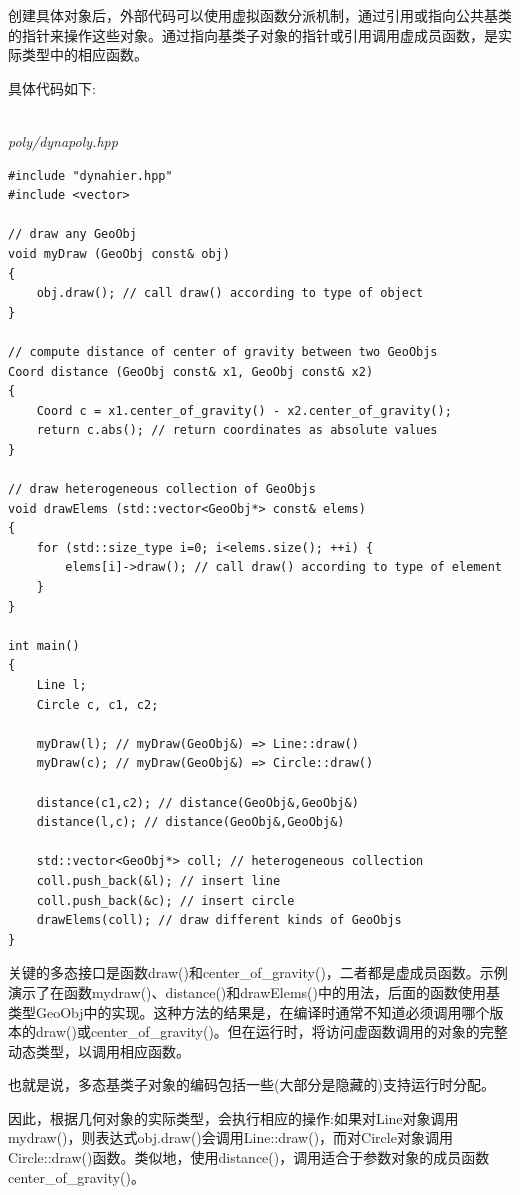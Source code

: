创建具体对象后，外部代码可以使用虚拟函数分派机制，通过引用或指向公共基类的指针来操作这些对象。通过指向基类子对象的指针或引用调用虚成员函数，是实际类型中的相应函数。

具体代码如下:

\hspace*{\fill} \\ %
\noindent
\textit{poly/dynapoly.hpp}
\begin{lstlisting}[style=styleCXX]
#include "dynahier.hpp"
#include <vector>

// draw any GeoObj
void myDraw (GeoObj const& obj)
{
	obj.draw(); // call draw() according to type of object
}

// compute distance of center of gravity between two GeoObjs
Coord distance (GeoObj const& x1, GeoObj const& x2)
{
	Coord c = x1.center_of_gravity() - x2.center_of_gravity();
	return c.abs(); // return coordinates as absolute values
}

// draw heterogeneous collection of GeoObjs
void drawElems (std::vector<GeoObj*> const& elems)
{
	for (std::size_type i=0; i<elems.size(); ++i) {
		elems[i]->draw(); // call draw() according to type of element
	}
}

int main()
{
	Line l;
	Circle c, c1, c2;
	
	myDraw(l); // myDraw(GeoObj&) => Line::draw()
	myDraw(c); // myDraw(GeoObj&) => Circle::draw()
	
	distance(c1,c2); // distance(GeoObj&,GeoObj&)
	distance(l,c); // distance(GeoObj&,GeoObj&)
	
	std::vector<GeoObj*> coll; // heterogeneous collection
	coll.push_back(&l); // insert line
	coll.push_back(&c); // insert circle
	drawElems(coll); // draw different kinds of GeoObjs
}
\end{lstlisting}

关键的多态接口是函数draw()和center\_of\_gravity()，二者都是虚成员函数。示例演示了在函数mydraw()、distance()和drawElems()中的用法，后面的函数使用基类型GeoObj中的实现。这种方法的结果是，在编译时通常不知道必须调用哪个版本的draw()或center\_of\_gravity()。但在运行时，将访问虚函数调用的对象的完整动态类型，以调用相应函数。

\begin{tcolorbox}[colback=webgreen!5!white,colframe=webgreen!75!black]
\hspace*{0.75cm}也就是说，多态基类子对象的编码包括一些(大部分是隐藏的)支持运行时分配。
\end{tcolorbox}

因此，根据几何对象的实际类型，会执行相应的操作:如果对Line对象调用mydraw()，则表达式obj.draw()会调用Line::draw()，而对Circle对象调用Circle::draw()函数。类似地，使用distance()，调用适合于参数对象的成员函数center\_of\_gravity()。

